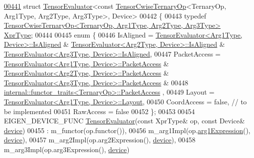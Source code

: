 \begin{DoxyCode}
\hyperlink{struct_eigen_1_1_tensor_evaluator_3_01const_01_tensor_cwise_ternary_op_3_01_ternary_op_00_01_arg9fef65261bbea39b0e5e8b56a6f07cfb}{00441} \textcolor{keyword}{struct }\hyperlink{struct_eigen_1_1_tensor_evaluator}{TensorEvaluator}<const \hyperlink{class_eigen_1_1_tensor_cwise_ternary_op}{TensorCwiseTernaryOp}<TernaryOp, Arg1Type, 
      Arg2Type, Arg3Type>, Device>
00442 \{
00443   \textcolor{keyword}{typedef} \hyperlink{class_eigen_1_1_tensor_cwise_ternary_op}{TensorCwiseTernaryOp<TernaryOp, Arg1Type, Arg2Type, Arg3Type>}
       \hyperlink{class_eigen_1_1_tensor_cwise_ternary_op}{XprType};
00444 
00445   \textcolor{keyword}{enum} \{
00446     IsAligned = \hyperlink{struct_eigen_1_1_tensor_evaluator}{TensorEvaluator<Arg1Type, Device>::IsAligned} & 
      \hyperlink{struct_eigen_1_1_tensor_evaluator}{TensorEvaluator<Arg2Type, Device>::IsAligned} & 
      \hyperlink{struct_eigen_1_1_tensor_evaluator}{TensorEvaluator<Arg3Type, Device>::IsAligned},
00447     PacketAccess = \hyperlink{struct_eigen_1_1_tensor_evaluator}{TensorEvaluator<Arg1Type, Device>::PacketAccess}
       & \hyperlink{struct_eigen_1_1_tensor_evaluator}{TensorEvaluator<Arg2Type, Device>::PacketAccess} & 
      \hyperlink{struct_eigen_1_1_tensor_evaluator}{TensorEvaluator<Arg3Type, Device>::PacketAccess} &
00448                    \hyperlink{struct_eigen_1_1internal_1_1functor__traits}{internal::functor\_traits<TernaryOp>::PacketAccess}
      ,
00449     Layout = \hyperlink{struct_eigen_1_1_tensor_evaluator}{TensorEvaluator<Arg1Type, Device>::Layout},
00450     CoordAccess = \textcolor{keyword}{false},  \textcolor{comment}{// to be implemented}
00451     RawAccess = \textcolor{keyword}{false}
00452   \};
00453 
00454   EIGEN\_DEVICE\_FUNC \hyperlink{struct_eigen_1_1_tensor_evaluator}{TensorEvaluator}(\textcolor{keyword}{const} XprType& op, \textcolor{keyword}{const} Device& 
      \hyperlink{struct_eigen_1_1_tensor_evaluator_a98b51809ed8f7a1f736eb7b952b9636e}{device})
00455     : m\_functor(op.functor()),
00456       m\_arg1Impl(op.\hyperlink{class_eigen_1_1_tensor_cwise_ternary_op_a6e797469eff84e6b24dab5bf5f2c1da8}{arg1Expression}(), \hyperlink{struct_eigen_1_1_tensor_evaluator_a98b51809ed8f7a1f736eb7b952b9636e}{device}),
00457       m\_arg2Impl(op.arg2Expression(), \hyperlink{struct_eigen_1_1_tensor_evaluator_a98b51809ed8f7a1f736eb7b952b9636e}{device}),
00458       m\_arg3Impl(op.arg3Expression(), \hyperlink{struct_eigen_1_1_tensor_evaluator_a98b51809ed8f7a1f736eb7b952b9636e}{device})

\end{DoxyCode}
